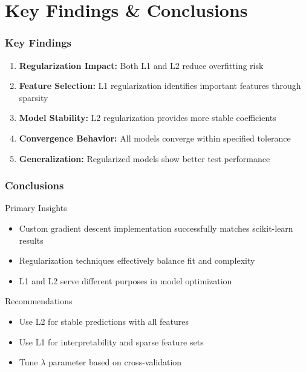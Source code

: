 \documentclass[11pt,aspectratio=169]{beamer}
\begin{document}
\section{Key Findings \& Conclusions}

\begin{frame}
    \frametitle{Key Findings}
    \begin{enumerate}
        \item \textbf{Regularization Impact:} Both L1 and L2 reduce overfitting risk
        \item \textbf{Feature Selection:} L1 regularization identifies important features through sparsity
        \item \textbf{Model Stability:} L2 regularization provides more stable coefficients
        \item \textbf{Convergence Behavior:} All models converge within specified tolerance
        \item \textbf{Generalization:} Regularized models show better test performance
    \end{enumerate}
\end{frame}

\begin{frame}
    \frametitle{Conclusions}
    \begin{block}{Primary Insights}
        \begin{itemize}
            \item Custom gradient descent implementation successfully matches scikit-learn results
            \item Regularization techniques effectively balance fit and complexity
            \item L1 and L2 serve different purposes in model optimization
        \end{itemize}
    \end{block}
    \vspace{0.5cm}
    \begin{block}{Recommendations}
        \begin{itemize}
            \item Use L2 for stable predictions with all features
            \item Use L1 for interpretability and sparse feature sets
            \item Tune $\lambda$ parameter based on cross-validation
        \end{itemize}
    \end{block}
\end{frame}
\end{document}
